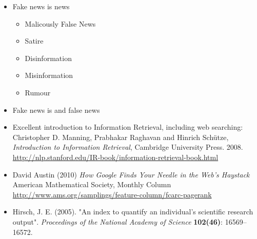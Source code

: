 \documentclass[a4paper,landscape,headrule,footrule,xetex]{foils}
\begin{document}



\begin{itemize}
\item Fake news is  news
  \begin{itemize}
  \item Malicously False News
  \item Satire
  \item Disinformation
  \item Misinformation
  \item Rumour
  \end{itemize}
\item Fake news is  and  false news
\end{itemize}





\begin{itemize}
\item Excellent introduction to Information Retrieval, including web searching:
\\ Christopher D. Manning, Prabhakar Raghavan and Hinrich Schütze, \textit{Introduction to Information Retrieval}, Cambridge University Press. 2008. 
\\ \url{http://nlp.stanford.edu/IR-book/information-retrieval-book.html}
\item David Austin (2010) \textit{How Google Finds Your Needle in the Web's Haystack}
American Mathematical Society, Monthly Column 
\\ \url{http://www.ams.org/samplings/feature-column/fcarc-pagerank}
\item Hirsch, J. E. (2005). "An index to quantify an individual's scientific research output". \textit{Proceedings of the National Academy of Science} \textbf{102(46)}: 16569–16572. 
\end{itemize}
\end{document}
